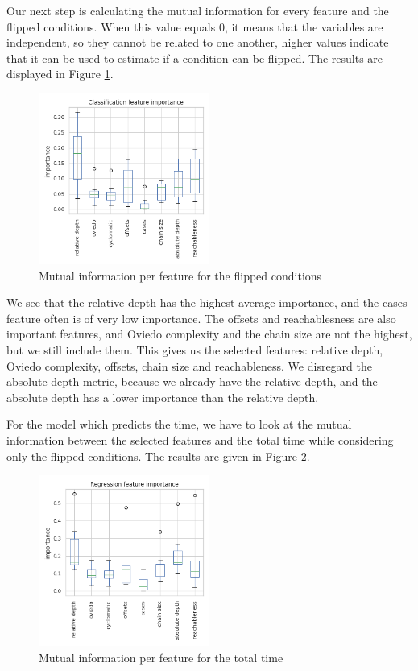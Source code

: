Our next step is calculating the mutual information for every feature and the flipped conditions. When this value equals 0, it means that the variables are independent, so they cannot be related to one another, higher values indicate that it can be used to estimate if a condition can be flipped. The results are displayed in Figure \ref{fig:feature-importance}.

\begin{figure}[H]
    \centering
    \includegraphics[width=0.5\textwidth]{5_results/graphs_new/feature_selection.png}  
    \caption{Mutual information per feature for the flipped conditions}
    \label{fig:feature-importance}
\end{figure}

We see that the relative depth has the highest average importance, and the cases feature often is of very low importance. The offsets and reachablesness are also important features, and Oviedo complexity and the chain size are not the highest, but we still include them. This gives us the selected features: relative depth, Oviedo complexity,  offsets, chain size and reachableness. We disregard the absolute depth metric, because we already have the relative depth, and the absolute depth has a lower importance than the relative depth.

For the model which predicts the time, we have to look at the mutual information between the selected features and the total time while considering only the flipped conditions. The results are given in Figure \ref{fig:feature-importance-regressor}.

\begin{figure}[ht]
    \centering
    \includegraphics[width=0.5\textwidth]{5_results/graphs_new/feature_selection_regression.png}  
    \caption{Mutual information per feature for the total time}
    \label{fig:feature-importance-regressor}
\end{figure}

